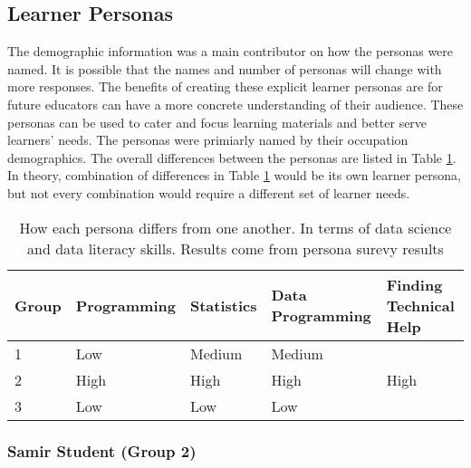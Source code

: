 \documentclass[020-persona_validation.tex]{subfiles}
\begin{document}
    \subsection{Learner Personas}

        The demographic information was a main contributor on how the personas were named.
        It is possible that the names and number of personas will change with more responses.
        The benefits of creating these explicit learner personas are for future educators
        can have a more concrete understanding of their audience.
        These personas can be used to cater and focus learning materials and better serve learners' needs.
        The personas were primiarly named by their occupation demographics.
        The overall differences between the personas are listed in Table \ref{tab:persona-summary-table}.
        In theory, combination of differences in Table \ref{tab:persona-summary-table} would be its own learner persona,
        but not every combination would require a different set of learner needs.

        \begin{table}[]
            \centering
            \caption[Persona Data Science Skill Rating]
            {How each persona differs from one another. In terms of data science and data literacy skills.
             Results come from persona surevy results
            }
            \begin{tabular}{lllll}
            \hline
            Group & Programming & Statistics & Data Programming & Finding Technical Help \\
            \hline
            1     & Low         & Medium     & Medium           &                        \\
            2     & High        & High       & High             & High                   \\
            3     & Low         & Low        & Low              &                        \\
            \hline
            \end{tabular}
            \label{tab:persona-summary-table}
        \end{table}

        \subsubsection{Samir Student (Group 2)}
\end{document}
